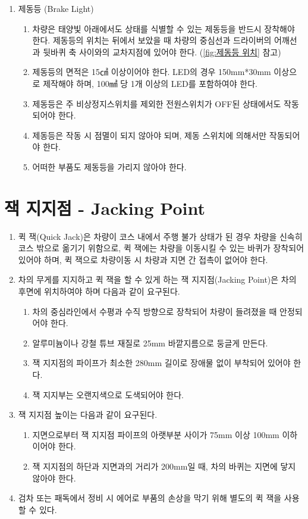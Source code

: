 \documentclass[final,a4paper,10pt]{report}
\begin{document}
\begin{enumerate}
    
  \item 제동등 (Brake Light)
    \begin{enumerate}
      \item 차량은 태양빛 아래에서도 상태를 식별할 수 있는 제동등을 반드시 장착해야 한다. 제동등의 위치는 뒤에서 보았을 때 차량의 중심선과 드라이버의 어깨선과 뒷바퀴 축 사이와의 교차지점에 있어야 한다. (\cref{fig:제동등 위치} 참고)
      \item 제동등의 면적은 15㎠ 이상이어야 한다. LED의 경우 150mm*30mm 이상으로 제작해야 하며, 100㎟ 당 1개 이상의 LED를 포함하여야 한다.
      \item 제동등은 주 비상정지스위치를 제외한 전원스위치가 OFF된 상태에서도 작동되어야 한다.
      \item 제동등은 작동 시 점멸이 되지 않아야 되며, 제동 스위치에 의해서만 작동되어야 한다.
      \item 어떠한 부품도 제동등을 가리지 않아야 한다.
    \end{enumerate}
    
\end{enumerate}

\section{잭 지지점 - Jacking Point}
\begin{enumerate}
  \item 퀵 잭(Quick Jack)은 차량이 코스 내에서 주행 불가 상태가 된 경우 차량을 신속히 코스 밖으로 옮기기 위함으로, 퀵 잭에는 차량을 이동시킬 수 있는 바퀴가 장착되어 있어야 하며, 퀵 잭으로 차량이동 시 차량과 지면 간 접촉이 없어야 한다.
  
  \item 차의 무게를 지지하고 퀵 잭을 할 수 있게 하는 잭 지지점(Jacking Point)은 차의 후면에 위치하여야 하며 다음과 같이 요구된다.
    \begin{enumerate}
      \item 차의 중심라인에서 수평과 수직 방향으로 장착되어 차량이 들려졌을 때 안정되어야 한다.
      \item 알루미늄이나 강철 튜브 재질로 25mm 바깥지름으로 둥글게 만든다.
      \item 잭 지지점의 파이프가 최소한 280mm 길이로 장애물 없이 부착되어 있어야 한다.
      \item 잭 지지부는 오랜지색으로 도색되어야 한다.
    \end{enumerate}
    
  \item 잭 지지점 높이는 다음과 같이 요구된다.
    \begin{enumerate}
      \item 지면으로부터 잭 지지점 파이프의 아랫부분 사이가 75mm 이상 100mm 이하이어야 한다.
      \item 잭 지지점의 하단과 지면과의 거리가 200mm일 때, 차의 바퀴는 지면에 닿지 않아야 한다.
    \end{enumerate}
  \item 검차 또는 패독에서 정비 시 에어로 부품의 손상을 막기 위해 별도의 퀵 잭을 사용할 수 있다.
\end{enumerate}
\end{document}
